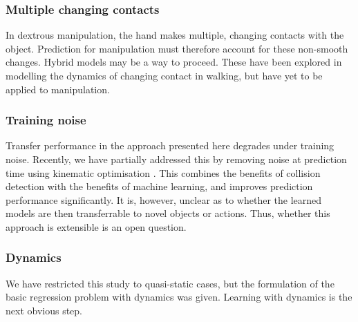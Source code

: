 \subsubsection{Multiple changing contacts}  In dextrous manipulation, the hand makes multiple, changing contacts with the object. Prediction for manipulation must therefore account for these non-smooth changes. Hybrid models may be a way to proceed. These have been explored in modelling the dynamics of changing contact in walking, but have yet to be applied to manipulation.

\subsubsection{ Training noise} Transfer performance in the approach presented here degrades under training noise. Recently, we have partially addressed this by removing noise at prediction time using kinematic optimisation \cite{belter2014iros}. This combines the benefits of collision detection with the benefits of machine learning, and improves prediction performance significantly. It is, however, unclear as to whether the learned models are then transferrable to novel objects or actions. Thus, whether this approach is extensible is an open question. 

\subsubsection{Dynamics} We have restricted this study to quasi-static cases, but the formulation of the basic regression problem with dynamics was given. Learning with dynamics is the next obvious step. 


